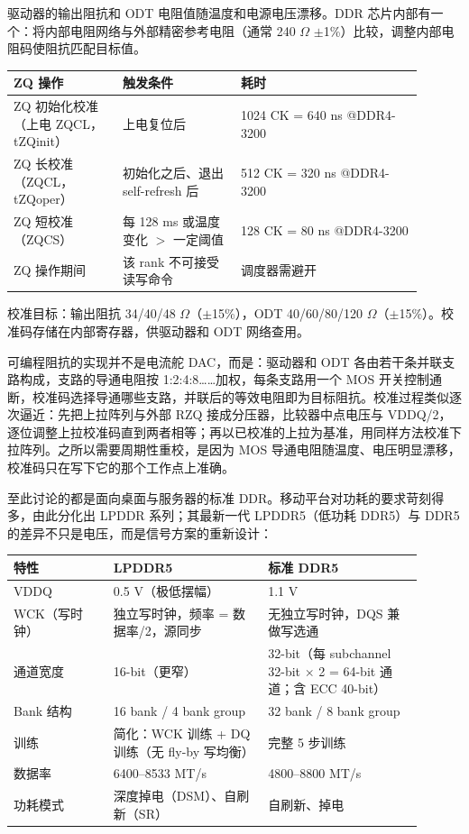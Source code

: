 

驱动器的输出阻抗和 ODT 电阻值随温度和电源电压漂移。DDR 芯片内部有一个：将内部电阻网络与外部精密参考电阻（通常 240 $\Omega$ $\pm$1\%）比较，调整内部电阻码使阻抗匹配目标值。

\begin{longtable}{L{0.24\linewidth}L{0.26\linewidth}L{0.4\linewidth}}
\toprule
ZQ 操作 & 触发条件 & 耗时 \\
\midrule
ZQ 初始化校准（上电 ZQCL，tZQinit） & 上电复位后 & 1024 CK = 640 ns @DDR4-3200 \\
ZQ 长校准（ZQCL，tZQoper） & 初始化之后、退出 self-refresh 后 & 512 CK = 320 ns @DDR4-3200 \\
ZQ 短校准（ZQCS） & 每 128 ms 或温度变化 $>$ 一定阈值 & 128 CK = 80 ns @DDR4-3200 \\
ZQ 操作期间 & 该 rank 不可接受读写命令 & 调度器需避开 \\
\bottomrule
\end{longtable}

校准目标：输出阻抗 34/40/48 $\Omega$（$\pm$15\%），ODT 40/60/80/120 $\Omega$（$\pm$15\%）。校准码存储在内部寄存器，供驱动器和 ODT 网络查用。

可编程阻抗的实现并不是电流舵 DAC，而是：驱动器和 ODT 各由若干条并联支路构成，支路的导通电阻按 1:2:4:8……加权，每条支路用一个 MOS 开关控制通断，校准码选择导通哪些支路，并联后的等效电阻即为目标阻抗。校准过程类似逐次逼近：先把上拉阵列与外部 RZQ 接成分压器，比较器中点电压与 VDDQ/2，逐位调整上拉校准码直到两者相等；再以已校准的上拉为基准，用同样方法校准下拉阵列。之所以需要周期性重校，是因为 MOS 导通电阻随温度、电压明显漂移，校准码只在写下它的那个工作点上准确。


至此讨论的都是面向桌面与服务器的标准 DDR。移动平台对功耗的要求苛刻得多，由此分化出 LPDDR 系列；其最新一代 LPDDR5（低功耗 DDR5）与 DDR5 的差异不只是电压，而是信号方案的重新设计：

\begin{longtable}{L{0.22\linewidth}L{0.34\linewidth}L{0.34\linewidth}}
\toprule
特性 & LPDDR5 & 标准 DDR5 \\
\midrule
VDDQ & 0.5 V（极低摆幅） & 1.1 V \\
WCK（写时钟） & 独立写时钟，频率 = 数据率/2，源同步 & 无独立写时钟，DQS 兼做写选通 \\
通道宽度 & 16-bit（更窄） & 32-bit（每 subchannel 32-bit $\times$ 2 = 64-bit 通道；含 ECC 40-bit） \\
Bank 结构 & 16 bank / 4 bank group & 32 bank / 8 bank group \\
训练 & 简化：WCK 训练 + DQ 训练（无 fly-by 写均衡） & 完整 5 步训练 \\
数据率 & 6400--8533 MT/s & 4800--8800 MT/s \\
功耗模式 & 深度掉电（DSM）、自刷新（SR） & 自刷新、掉电 \\
\bottomrule
\end{longtable}

